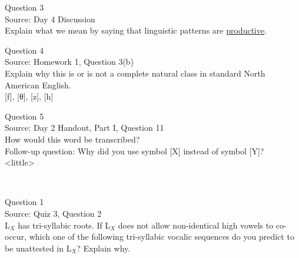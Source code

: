 \documentclass[12pt]{article}
\begin{document}
{\large Question 3}\\

Source: Day 4 Discussion\\

Explain what we mean by saying that linguistic patterns are \underline{productive}.\\


\newpage

{\large Question 4}\\

Source: Homework 1, Question 3(b)\\

Explain why this is or is not a complete natural class in standard North American English.\\

{[f]}, {[θ]}, {[z]}, {[h]}


\newpage

{\large Question 5}\\

Source: Day 2 Handout, Part I, Question 11\\

How would this word be transcribed?\\ Follow-up question: Why did you use symbol [X] instead of symbol [Y]?\\

<little>


\newpage

\begin{center}
\textbf{{\color{red}{\HUGE END OF EXAM}}}\\

\end{center}
\newpage

\begin{center}
\textbf{{\color{blue}{\HUGE START OF EXAM\\}}}

\textbf{{\color{blue}{\HUGE Student ID: 7336\\}}}

\textbf{{\color{blue}{\HUGE 1:15 - 1:30 PM\\}}}

\end{center}
\newpage

{\large Question 1}\\

Source: Quiz 3, Question 2\\

L$_X$ has tri-syllabic roots. If L$_X$ does not allow non-identical high vowels to co-occur, which one of the following tri-syllabic vocalic sequences do you predict to be unattested in L$_X$? Explain why.\\
\end{document}
